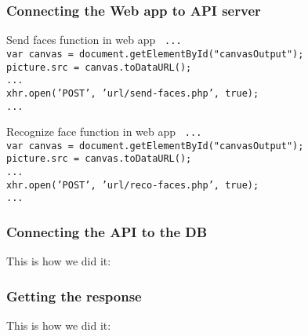 \begin{frame} \frametitle{Connecting the Web app to API server}
	
	\vfill
	\begin{block} {Send faces function in web app}
		\texttt{
			...\\
	  		var canvas = document.getElementById("canvasOutput");\\
    	  		picture.src = canvas.toDataURL();\\
			...\\
	  		xhr.open('POST', 'url/send-faces.php', true);\\
			...
		}
	\end{block}
	\vfill
	\begin{block} {Recognize face function in web app}
		\texttt{
			...\\
			var canvas = document.getElementById("canvasOutput");\\
		    picture.src = canvas.toDataURL();\\
		    ...\\
		    xhr.open('POST', 'url/reco-faces.php', true);\\
		    ...		
		}
	\end{block}
	\vfill
\end{frame}

\begin{frame} \frametitle{Connecting the API to the DB}

	This is how we did it:

\end{frame}

\begin{frame} \frametitle{Getting the response}

	This is how we did it:

\end{frame}